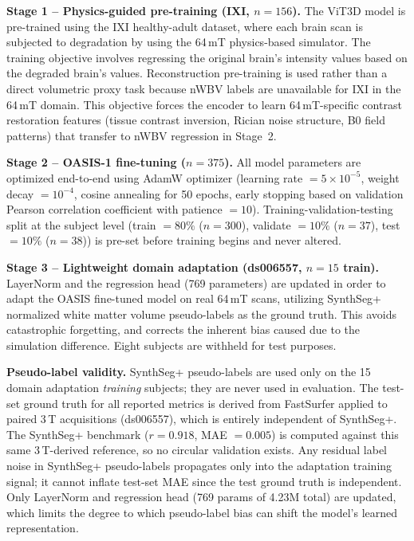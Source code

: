 \documentclass{ieeeaccess}
\begin{document}
\textbf{Stage 1 -- Physics-guided pre-training (IXI, $n=156$).}
The ViT3D model is pre-trained using the IXI healthy-adult dataset, where
each brain scan is subjected to degradation by using the 64\,mT physics-based
simulator. The training objective involves regressing the original brain's
intensity values based on the degraded brain's values. Reconstruction
pre-training is used rather than a direct volumetric proxy task because
nWBV labels are unavailable for IXI in the 64\,mT domain. This objective
forces the encoder to learn 64\,mT-specific contrast restoration features
(tissue contrast inversion, Rician noise structure, B0 field patterns) that
transfer to nWBV regression in Stage~2.

\textbf{Stage 2 -- OASIS-1 fine-tuning ($n= 375$).}
All model parameters are optimized end-to-end using AdamW optimizer (learning
rate $= 5 \times 10^{-5}$, weight decay $= 10^{-4}$, cosine annealing for 50
epochs, early stopping based on validation Pearson correlation coefficient
with patience $= 10$). Training-validation-testing split at the subject level
(train $= 80\%$ ($n = 300$), validate $= 10\%$ ($n = 37$), test $= 10\%$
($n = 38$)) is pre-set before training begins and never altered.

\textbf{Stage 3 -- Lightweight domain adaptation (ds006557, $n= 15$ train).}
LayerNorm and the regression head (769 parameters) are updated in order to
adapt the OASIS fine-tuned model on real 64\,mT scans, utilizing SynthSeg+
normalized white matter volume pseudo-labels as the ground truth. This avoids
catastrophic forgetting, and corrects the inherent bias caused due to the
simulation difference. Eight subjects are withheld for test purposes.

\textbf{Pseudo-label validity.}
SynthSeg+ pseudo-labels are used only on the 15 domain adaptation
\emph{training} subjects; they are never used in evaluation. The test-set
ground truth for all reported metrics is derived from FastSurfer applied to
paired 3\,T acquisitions (ds006557), which is entirely independent of
SynthSeg+. The SynthSeg+ benchmark ($r = 0.918$, MAE $= 0.005$) is computed
against this same 3\,T-derived reference, so no circular validation exists.
Any residual label noise in SynthSeg+ pseudo-labels propagates only into the
adaptation training signal; it cannot inflate test-set MAE since the test
ground truth is independent. Only LayerNorm and regression head (769 params
of 4.23M total) are updated, which limits the degree to which pseudo-label
bias can shift the model's learned representation.
\end{document}
